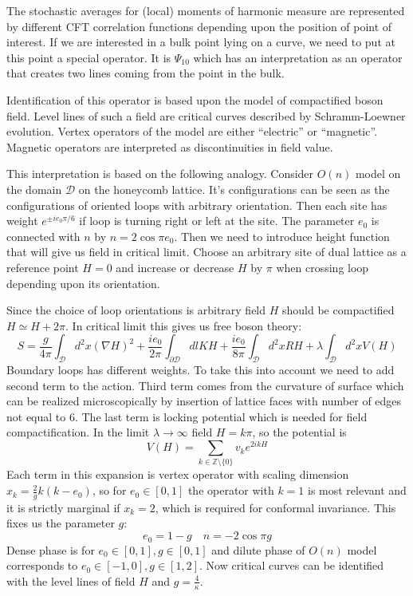 \documentclass[12pt]{article}
\begin{document}
The stochastic averages for (local) moments of harmonic measure are represented by different CFT
correlation functions depending upon the position of point of interest. If we are interested in a
bulk point lying on a curve, we need to put at this point a special operator. It is $\Psi_{10}$
which has an interpretation as an operator that creates two lines coming from the point in the bulk.

Identification of this operator is based upon the model of compactified boson field. Level lines of
such a field are critical curves described by Schramm-Loewner evolution. Vertex operators of the
model are either ``electric'' or ``magnetic''. Magnetic operators are interpreted as discontinuities
in field value. 

This interpretation is based on the following analogy. Consider $O(n)$ model on the domain
$\mathcal{D}$ on the honeycomb lattice. It's configurations can be seen as the configurations of
oriented loops with arbitrary orientation. Then each site has weight $e^{\pm i e_{0}\pi/6}$ if loop
is turning right or left at the site. The parameter $e_{0}$ is connected with $n$ by $n=2\cos \pi
e_{0}$. Then we need to introduce height function that will give us field in critical limit. Choose
an arbitrary site of dual lattice as a reference point $H=0$ and increase or decrease $H$ by $\pi$
when crossing loop depending upon its orientation.

Since the choice of loop orientations is arbitrary field $H$ should be compactified $H\simeq
H+2\pi$.
 In critical limit this gives us free boson theory:
\begin{equation}
  \label{eq:126}
  S=\frac{g}{4\pi} \int_{\mathcal{D}} d^{2}x (\nabla H)^{2} +\frac{i e_{0}}{2\pi}
  \int_{\partial\mathcal{D}} dl KH +\frac{i e_{0}}{8\pi} \int_{\mathcal{D}} d^{2}x
  RH+\lambda\int_{\mathcal{D}} d^{2}x V(H)
\end{equation}
Boundary loops has different weights. To take this into account we need to add second term to the
action. Third term comes from the curvature of surface which can be realized microscopically by
insertion of lattice faces with number of edges not equal to 6. The last term is locking potential
which is needed for field compactification. In the limit $\lambda\to\infty$ field $H=k\pi$, so the
potential is
\begin{equation}
  \label{eq:127}
  V(H)=\sum_{k\in\mathbb{Z}\setminus \{0\}}v_{k}e^{2ikH}
\end{equation}
Each term in this expansion is vertex operator with scaling dimension $x_{k}=\frac{2}{g}k(k-e_{0})$,
so for $e_{0}\in [0,1]$ the operator with $k=1$ is most relevant and it is strictly marginal if
$x_{k}=2$, which is required for conformal invariance. This fixes us the parameter $g$:
\begin{equation}
  \label{eq:128}
  e_{0}=1-g\quad n=-2\cos \pi g
\end{equation}
Dense phase is for $e_{0}\in [0,1], g\in [0,1]$ and dilute phase of $O(n)$ model corresponds to
$e_{0}\in [-1,0], g\in [1,2]$.
Now critical curves can be identified with the level lines of field $H$ and $g=\frac{4}{\kappa}$. 
\end{document}
